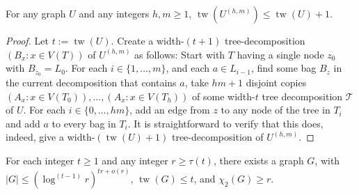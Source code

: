 \documentclass[kpfonts]{patmorin}
\DeclareMathOperator{\tw}{tw}
\newcommand{\trn}{\chi_2}
\theoremstyle{named}
\begin{document}
\begin{lem}\label{boost-treewidth}
    For any graph $U$ and any integers $h,m\ge 1$, $\tw(U^{(h,m)})\le \tw(U)+1$.
\end{lem}

\begin{proof}
  Let $t:=\tw(U)$.
  Create a width-$(t+1)$ tree-decomposition $(B_x:x\in V(T))$ of $U^{(h,m)}$ as follows: Start with $T$ having a single node $z_0$ with $B_{z_0}=L_0$.  For each $i\in\{1,\ldots,m\}$, and each $a\in L_{i-1}$, find some bag $B_z$ in the current decomposition that contains $a$, take $hm+1$ disjoint copies $(A_x:x\in V(T_0)),\ldots,(A_x:x\in V(T_h))$ of some width-$t$ tree decomposition $\mathcal{T}$ of $U$.  For each $i\in\{0,\ldots,hm\}$, add an edge from $z$ to any node of the tree in $T_i$ and add $a$ to every bag in $T_i$.  It is straightforward to verify that this does, indeed, give a width-$(\tw(U)+1)$ tree-decomposition of $U^{(h,m)}$.
\end{proof}


\begin{lem}\label{treewidth-lower-bound}
    For each integer $t\ge 1$ and any integer $r\ge \tau(t)$, there exists a graph $G$, with $|G|\le (\log^{(t-1)}r)^{tr + o(r)}$, $\tw(G)\le t$, and $\trn(G)\ge r$.
\end{lem}
\end{document}
